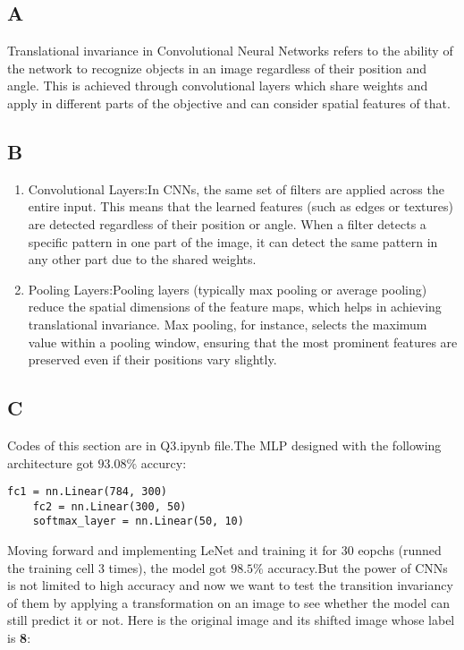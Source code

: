 \documentclass{article}
\begin{document}
\subsection*{A}
Translational invariance in Convolutional Neural Networks refers to the ability of the network to recognize objects in an image regardless of their position and angle.
This is achieved through convolutional layers which share weights and apply in different parts of the objective and can consider spatial features of that.

\subsection*{B}
\begin{enumerate}
    \item Convolutional Layers:In CNNs, the same set of filters are applied across the entire input. This means that the learned features (such as edges or textures) are detected regardless of their position or angle. When a filter detects a specific pattern in one part of the image, it can detect the same pattern in any other part due to the shared weights.
    \item Pooling Layers:Pooling layers (typically max pooling or average pooling) reduce the spatial dimensions of the feature maps, which helps in achieving translational invariance. Max pooling, for instance, selects the maximum value within a pooling window, ensuring that the most prominent features are preserved even if their positions vary slightly.
\end{enumerate}

\subsection*{C}
Codes of this section are in Q3.ipynb file.The MLP designed with the following architecture got $93.08 \%$ accurcy:
\begin{lstlisting}[style=mystyle]
    fc1 = nn.Linear(784, 300)
    fc2 = nn.Linear(300, 50)
    softmax_layer = nn.Linear(50, 10)    
\end{lstlisting}

Moving forward and implementing LeNet and training it for 30 eopchs (runned the training cell 3 times), the model got $98.5\%$ accuracy.But the power of CNNs is not limited
to high accuracy and now we want to test the transition invariancy of them by applying a transformation on an image to see whether the model can still predict it or not.
Here is the original image and its shifted image whose label is \textbf{8}:
\end{document}
